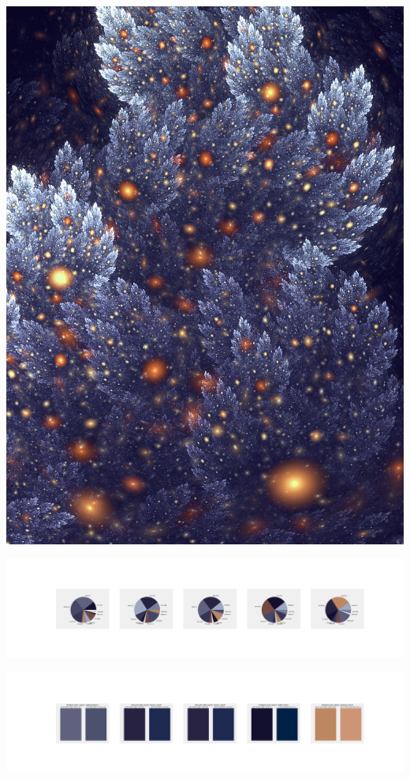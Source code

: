 \documentclass[11pt]{article}
\begin{document}
\begin{landscape}
    \begin{center}
    \includegraphics[width=\textwidth]{./nbimg/file (151).jpg}
    \end{center}

    \begin{center}
    \includegraphics[width=250mm]{./nbimg/pie-58.jpg}
    \end{center}

    \begin{center}
    \includegraphics[width=250mm]{./nbimg/peak-58.jpg}
    \end{center}
    


\end{landscape}
\end{document}
